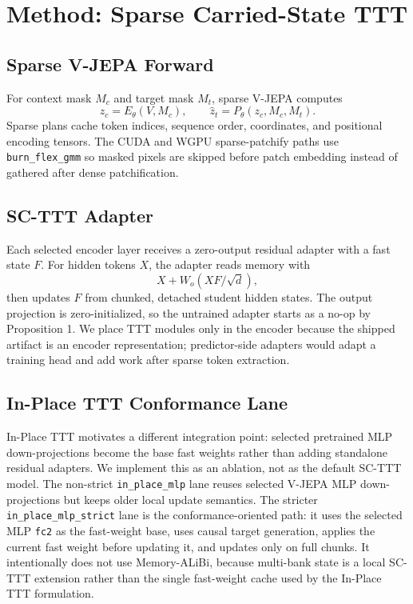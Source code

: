 \documentclass[10pt]{article}
\begin{document}
\section{Method: Sparse Carried-State TTT}

\subsection{Sparse V-JEPA Forward}

For context mask $M_c$ and target mask $M_t$, sparse V-JEPA computes
\begin{equation}
  z_c = E_\theta(V, M_c), \qquad \hat{z}_t = P_\theta(z_c, M_c, M_t).
\end{equation}
Sparse plans cache token indices, sequence order, coordinates, and positional
encoding tensors.  The CUDA and WGPU sparse-patchify paths use
\texttt{burn\_flex\_gmm} so masked pixels are skipped before patch embedding
instead of gathered after dense patchification.

\subsection{SC-TTT Adapter}

Each selected encoder layer receives a zero-output residual adapter with a fast
state $F$.  For hidden tokens $X$, the adapter reads memory with
\begin{equation}
  X + W_o(XF/\sqrt{d}),
\end{equation}
then updates $F$ from chunked, detached student hidden states.  The output
projection is zero-initialized, so the untrained adapter starts as a no-op by
Proposition 1.  We place TTT modules only in the encoder because the shipped
artifact is an encoder representation; predictor-side adapters would adapt a
training head and add work after sparse token extraction.

\subsection{In-Place TTT Conformance Lane}

In-Place TTT \cite{feng2026inplace} motivates a different integration point:
selected pretrained MLP down-projections become the base fast weights rather
than adding standalone residual adapters.  We implement this as an ablation,
not as the default SC-TTT model.  The non-strict \texttt{in\_place\_mlp} lane
reuses selected V-JEPA MLP down-projections but keeps older local update
semantics.  The stricter \texttt{in\_place\_mlp\_strict} lane is the
conformance-oriented path: it uses the selected MLP \texttt{fc2} as the
fast-weight base, uses causal target generation, applies the current fast
weight before updating it, and updates only on full chunks.  It intentionally
does not use Memory-ALiBi, because multi-bank state is a local SC-TTT extension
rather than the single fast-weight cache used by the In-Place TTT formulation.
\end{document}
